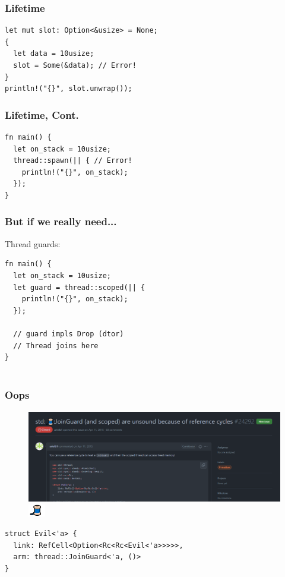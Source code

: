 \documentclass[UTF-8]{ctexbeamer}
\begin{document}
\begin{frame}[fragile]
  \frametitle{Lifetime}

  \begin{verbatim}
let mut slot: Option<&usize> = None;
{
  let data = 10usize;
  slot = Some(&data); // Error!
}
println!("{}", slot.unwrap());
  \end{verbatim}
\end{frame}

\begin{frame}[fragile]
  \frametitle{Lifetime, Cont.}

  \begin{verbatim}
fn main() {
  let on_stack = 10usize;
  thread::spawn(|| { // Error!
    println!("{}", on_stack);
  });
}
  \end{verbatim}
\end{frame}

\begin{frame}[fragile]
  \frametitle{But if we really need...}

  \pause

  Thread guards:

  \begin{verbatim}
fn main() {
  let on_stack = 10usize;
  let guard = thread::scoped(|| {
    println!("{}", on_stack);
  });

  // guard impls Drop (dtor)
  // Thread joins here
}
    
  \end{verbatim}
\end{frame}

\begin{frame}[fragile]
  \frametitle{Oops}

  \begin{figure}
    \includegraphics[width=\textwidth]{assets/thread.png}
    \caption{\includegraphics[width=2em]{assets/thread-small.png}}
  \end{figure}

  \begin{verbatim}
struct Evil<'a> {
  link: RefCell<Option<Rc<Rc<Evil<'a>>>>>,
  arm: thread::JoinGuard<'a, ()>
}
  \end{verbatim}
\end{frame}
\end{document}
